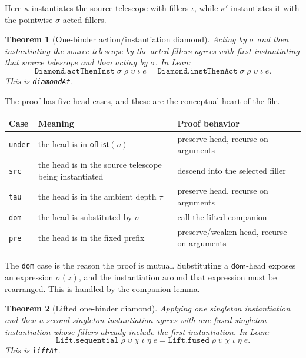 \documentclass[11pt]{article}
\newtheorem{theorem}{Theorem}
\newcommand{\Code}[1]{\texttt{#1}}
\newcommand{\dom}{\mathsf{dom}}
\newcommand{\ofList}{\mathsf{ofList}}
\begin{document}
Here \(\kappa\) instantiates the source telescope with fillers
\(\iota\), while \(\kappa'\) instantiates it with the pointwise
\(\sigma\)-acted fillers.

\begin{theorem}[One-binder action/instantiation diamond]
Acting by \(\sigma\) and then instantiating the source telescope by
the acted fillers agrees with first instantiating that source telescope and then
acting by \(\sigma\).  In Lean:
\[
  \Code{Diamond.actThenInst}\;\sigma\;\rho\;\upsilon\;\iota\;e
  =
  \Code{Diamond.instThenAct}\;\sigma\;\rho\;\upsilon\;\iota\;e.
\]
This is \Code{diamondAt}.
\end{theorem}

The proof has five head cases, and these are the conceptual heart of the file.

\begin{center}
\begin{tabular}{lll}
\toprule
Case & Meaning & Proof behavior \\
\midrule
\Code{under} & the head is in \(\ofList(\upsilon)\) & preserve head, recurse on arguments \\
\Code{src} & the head is in the source telescope being instantiated & descend into the selected filler \\
\Code{tau} & the head is in the ambient depth \(\tau\) & preserve head, recurse on arguments \\
\Code{dom} & the head is substituted by \(\sigma\) & call the lifted companion \\
\Code{pre} & the head is in the fixed prefix & preserve/weaken head, recurse on arguments \\
\bottomrule
\end{tabular}
\end{center}

The \Code{dom} case is the reason the proof is mutual.  Substituting a
\(\dom\)-head exposes an expression \(\sigma(z)\), and the instantiation
around that expression must be rearranged.  This is handled by the companion
lemma.

\begin{theorem}[Lifted one-binder diamond]
Applying one singleton instantiation and then a second singleton instantiation
agrees with one fused singleton instantiation whose fillers already include
the first instantiation.  In Lean:
\[
  \Code{Lift.sequential}\;\rho\;\upsilon\;\chi\;\iota\;\eta\;e
  =
  \Code{Lift.fused}\;\rho\;\upsilon\;\chi\;\iota\;\eta\;e.
\]
This is \Code{liftAt}.
\end{theorem}
\end{document}
